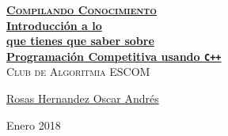 \documentclass[12pt, fleqn]{report}                             %
\author{Oscar Andrés Rosas}                                     %
\theoremstyle{break}                                            %
\newcommand{\textCode}[1]  { \texttt{#1} }                      %
\newcommand{\Cpp}{\ignorespaces\textCode{C++}}                  %
\begin{document}
\begin{titlepage}
    
    \pagecolor{TitlePageColor}                                      %
    \color{white}                                                   %
    \newcommand{\Github}{https://compilandoconocimiento.github.io/Reference/} %

    \vspace                                                         %
    \baselineskip                                                   %

    \makebox[0pt][l]{\rule{1.3\textwidth}{3pt}}                     %
    
    \href{\Github}                                                  %
    {\textbf{\textsc{\Huge Compilando Conocimiento}}}\\[2.7cm]      %

    \href{\Github}                                                  %
    {\fontsize{35}{46}\selectfont                                   %
        \textbf{Introducción a lo\\[0.6cm] 
        que tienes que saber sobre \\[0.4cm]
        Programación Competitiva usando \Cpp}}\\[0.5cm]             %
    \textcolor{ColorSubtext}{\textsc{\Huge Club de Algoritmia ESCOM}}%
    
    \vfill                                                          %
    
    \href{https://SoyOscarRH.github.io}                            %
    {\LARGE \textsf{Rosas Hernandez Oscar Andrés}}                 %


    \vspace                                                         %
    \baselineskip                                                   %
    
    {\large \textsf{Enero 2018}}                                    %

\end{titlepage}
\end{document}
